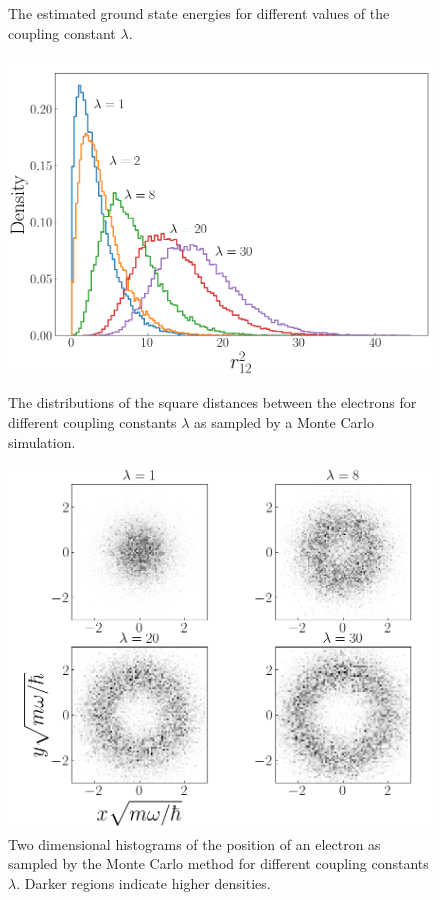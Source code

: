 \documentclass[twocolumn]{article}
\begin{document}
\begin{large}
\begin{figure}[!b]
    \caption{The estimated ground state energies for different values of the coupling constant $\lambda$.}
    \label{11apr2039}
    \includegraphics[scale=0.35]{distances.png}
    \caption{The distributions of the square distances between the electrons for different coupling constants $\lambda$ as sampled by a Monte Carlo simulation.}
    \label{11apr2214}
    \includegraphics[scale=0.35]{2dhist.png}
    \caption{Two dimensional histograms of the position of an electron as sampled by the Monte Carlo method for different coupling constants $\lambda$. Darker regions indicate higher densities.}
    \label{11apr2215}

\end{figure}
\end{large}
\end{document}
